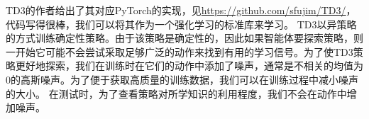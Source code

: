 TD3的作者给出了其对应PyTorch的实现，见\url{https://github.com/sfujim/TD3/}，代码写得很棒，我们可以将其作为一个强化学习的标准库来学习。
TD3以异策略的方式训练确定性策略。由于该策略是确定性的，因此如果智能体要探索策略，则一开始它可能不会尝试采取足够广泛的动作来找到有用的学习信号。为了使TD3策略更好地探索，我们在训练时在它们的动作中添加了噪声，通常是不相关的均值为0的高斯噪声。为了便于获取高质量的训练数据，我们可以在训练过程中减小噪声的大小。
在测试时，为了查看策略对所学知识的利用程度，我们不会在动作中增加噪声。









